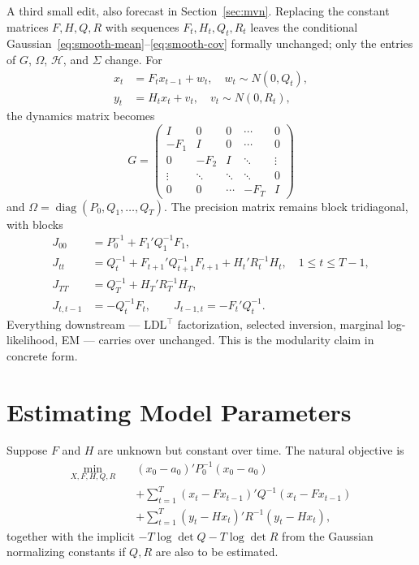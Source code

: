 \documentclass[11pt]{article}
\newcommand{\diag}{\operatorname{diag}}
\begin{document}
A third small edit, also forecast in Section~\ref{sec:mvn}.  Replacing
the constant matrices $F,H,Q,R$ with sequences $F_t,H_t,Q_t,R_t$ leaves
the conditional Gaussian~\eqref{eq:smooth-mean}--\eqref{eq:smooth-cov}
formally unchanged; only the entries of $G$, $\Omega$, $\mathcal H$,
and $\Sigma$ change.  For
\begin{align}
x_t&=F_tx_{t-1}+w_t,\quad w_t\sim N(0,Q_t),\\
y_t&=H_tx_t+v_t,\quad v_t\sim N(0,R_t),
\end{align}
the dynamics matrix becomes
\begin{equation}
G=\begin{pmatrix}
I & 0 & 0 & \cdots & 0\\
-F_1 & I & 0 & \cdots & 0\\
0 & -F_2 & I & \ddots & \vdots\\
\vdots & \ddots & \ddots & \ddots & 0\\
0 & 0 & \cdots & -F_T & I
\end{pmatrix}
\end{equation}
and $\Omega=\diag(P_0,Q_1,\ldots,Q_T)$.  The precision matrix remains
block tridiagonal, with blocks
\begin{align}
J_{00} &= P_0^{-1}+F_1'Q_1^{-1}F_1,\\
J_{tt} &= Q_t^{-1}+F_{t+1}'Q_{t+1}^{-1}F_{t+1}+H_t'R_t^{-1}H_t,\quad 1\le t\le T-1,\\
J_{TT} &= Q_T^{-1}+H_T'R_T^{-1}H_T,\\
J_{t,t-1}&=-Q_t^{-1}F_t,\qquad J_{t-1,t}=-F_t'Q_t^{-1}.
\end{align}
Everything downstream --- LDL$^\top$ factorization, selected inversion,
marginal log-likelihood, EM --- carries over unchanged.  This is
the modularity claim in concrete form.

\section{Estimating Model Parameters}
\label{sec:em}

Suppose $F$ and $H$ are unknown but constant over time.  The natural
objective is
\begin{align}
\min_{X,F,H,Q,R} \quad
&(x_0-a_0)'P_0^{-1}(x_0-a_0)\\
&+\sum_{t=1}^T (x_t-Fx_{t-1})'Q^{-1}(x_t-Fx_{t-1})\\
&+\sum_{t=1}^T (y_t-Hx_t)'R^{-1}(y_t-Hx_t),
\end{align}
together with the implicit $-T\log\det Q-T\log\det R$ from the Gaussian
normalizing constants if $Q,R$ are also to be estimated.
\end{document}
